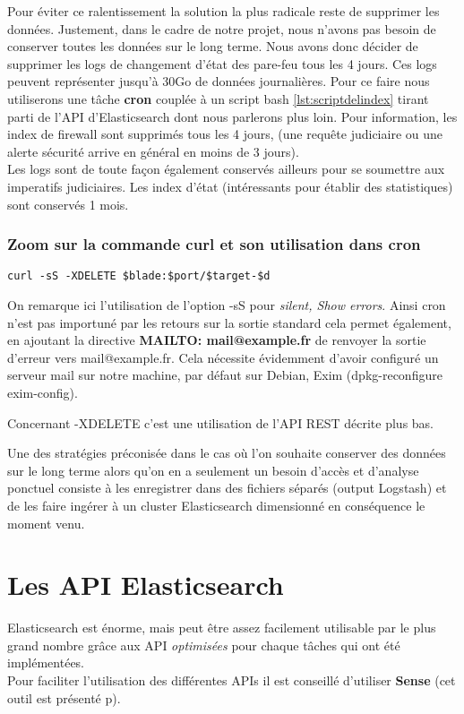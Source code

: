 {Pour éviter ce ralentissement la solution la plus radicale reste de supprimer les 
données. Justement, dans le cadre de notre projet, nous n'avons pas besoin de conserver 
toutes les données sur le long terme. Nous avons donc décider de supprimer les logs 
de changement d'état des pare-feu tous les 4 jours. Ces logs peuvent représenter 
jusqu'à 30Go de données journalières. 
Pour ce faire nous utiliserons une tâche \textbf{cron} couplée à un script bash 
\ref{lst:scriptdelindex} tirant parti de l'API d'Elasticsearch dont nous parlerons 
plus loin. Pour information, les index de firewall sont supprimés tous les 4 jours, 
(une requête judiciaire ou une alerte sécurité arrive en général en moins de 3 jours).\\ 
Les logs sont de toute façon également conservés ailleurs pour se soumettre aux 
imperatifs judiciaires. Les index d'état (intéressants pour établir des statistiques)
sont conservés 1 mois.%
\subsubsection{Zoom sur la commande curl et son utilisation dans cron}

\begin{lstlisting}[style=code,label={lst:curlexemple},caption={Extrait de notre script \ref{lst:scriptdelindex}}]
curl -sS -XDELETE $blade:$port/$target-$d
\end{lstlisting}

On remarque ici l'utilisation de l'option -sS pour \textit{silent, Show errors}.
Ainsi cron n'est pas importuné par les retours sur la sortie standard cela permet
également, en ajoutant la directive \textbf{MAILTO: mail@example.fr} de renvoyer
la sortie d'erreur vers mail@example.fr. Cela nécessite évidemment d'avoir configuré
un serveur mail sur notre machine, par défaut sur Debian, Exim (dpkg-reconfigure 
exim-config).

Concernant -XDELETE c'est une utilisation de l'API REST décrite plus bas.

Une des stratégies préconisée dans le cas où l'on souhaite conserver des données sur
le long terme alors qu'on en a seulement un besoin d'accès et d'analyse ponctuel
consiste à les enregistrer dans des fichiers séparés (output Logstash) et de les 
faire ingérer à un cluster Elasticsearch dimensionné en conséquence le moment venu.


\section{Les API Elasticsearch}
Elasticsearch est énorme, mais peut être assez facilement utilisable par le 
plus grand nombre grâce aux \gls{API} \emph{optimisées} pour chaque tâches qui ont été implémentées.\\[2mm]
Pour faciliter l'utilisation des différentes APIs il est conseillé d'utiliser \textbf{Sense}
(cet outil est présenté p\pageref{subsec:elasticsense}).


}
